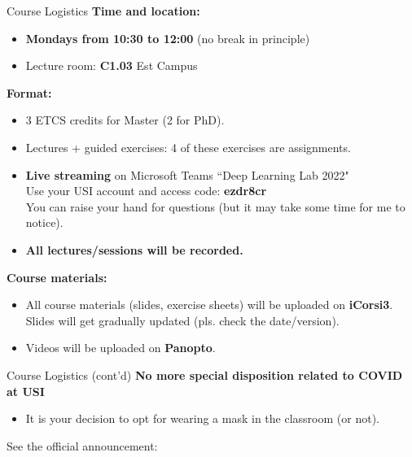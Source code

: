 
\begin{frame}{Course Logistics}
\textbf{Time and location:}
\begin{itemize}
\item \textbf{Mondays from 10:30 to 12:00} (no break in principle)
\item Lecture room: \textbf{C1.03} Est Campus 
\end{itemize}
\pause
\vsp
\textbf{Format:}
  \begin{itemize}
\item 3 ETCS credits for Master (2 for PhD).
\item Lectures + guided exercises: 4 of these exercises are \alert{assignments}.
\item \textbf{Live streaming} on Microsoft Teams ``Deep Learning Lab 2022"\\
Use your USI account and access code: \textbf{ezdr8cr}\\
You can raise your hand for questions (but it may take some time for me to notice).
\item \textbf{All lectures/sessions will be recorded.}
\end{itemize}
\pause
\vsp
\textbf{Course materials:}
\begin{itemize}
\item All course materials (slides, exercise sheets) will be uploaded on \textbf{iCorsi3}. Slides will get gradually updated (pls. check the date/version).
\item Videos will be uploaded on \textbf{Panopto}.
\end{itemize}
\end{frame}

\begin{frame}{Course Logistics (cont'd)}
\vspace{-5mm}
\textbf{No more special disposition related to COVID at USI}
\begin{itemize}
\item It is your decision to opt for wearing a mask in the classroom (or not).
\end{itemize}
\vsp
See the official announcement: 
\end{frame}


